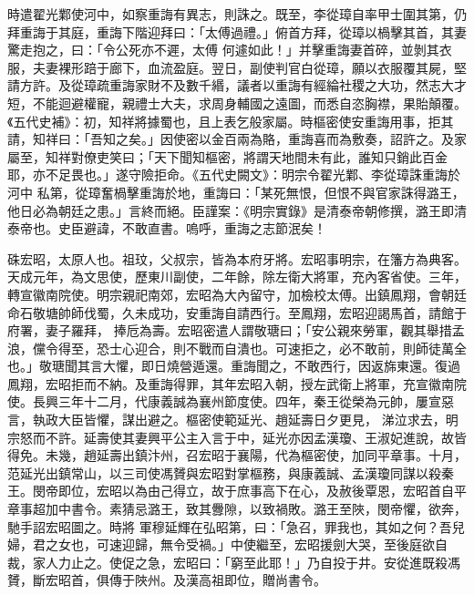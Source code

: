 \begin{pinyinscope}
 時遣翟光鄴使河中，如察重誨有異志，則誅之。既至，李從璋自率甲士圍其第，仍拜重誨于其庭，重誨下階迎拜曰：「太傅過禮。」俯首方拜，從璋以楇擊其首，其妻驚走抱之，曰：「令公死亦不遲，太傅
 何遽如此！」并擊重誨妻首碎，並剝其衣服，夫妻裸形踣于廊下，血流盈庭。翌日，副使判官白從璋，願以衣服覆其屍，堅請方許。及從璋疏重誨家財不及數千緡，議者以重誨有經綸社稷之大功，然志大才短，不能迴避權寵，親禮士大夫，求周身輔國之遠圖，而悉自恣胸襟，果貽顛覆。《五代史補》：初，知祥將據蜀也，且上表乞般家屬。時樞密使安重誨用事，拒其請，知祥曰：「吾知之矣。」因使密以金百兩為賂，重誨喜而為敷奏，詔許之。及家屬至，知祥對僚吏笑曰；「天下聞知樞密，將謂天地間未有此，誰知只銷此百金耶，亦不足畏也。」遂守險拒命。《五代史闕文》：明宗令翟光鄴、李從璋誅重誨於河中
 私第，從璋奮楇擊重誨於地，重誨曰：「某死無恨，但恨不與官家誅得潞王，他日必為朝廷之患。」言終而絕。臣謹案：《明宗實錄》是清泰帝朝修撰，潞王即清泰帝也。史臣避諱，不敢直書。嗚呼，重誨之志節泯矣！



 硃宏昭，太原人也。祖玟，父叔宗，皆為本府牙將。宏昭事明宗，在籓方為典客。天成元年，為文思使，歷東川副使，二年餘，除左衛大將軍，充內客省使。三年，轉宣徽南院使。明宗親祀南郊，宏昭為大內留守，加檢校太傅。出鎮鳳翔，會朝廷命石敬塘帥師伐蜀，久未成功，安重誨自請西行。至鳳翔，宏昭迎謁馬首，請館于府署，妻子羅拜，
 捧卮為壽。宏昭密遣人謂敬瑭曰；「安公親來勞軍，觀其舉措孟浪，儻令得至，恐士心迎合，則不戰而自潰也。可速拒之，必不敢前，則師徒萬全也。」敬瑭聞其言大懼，即日燒營遁還。重誨聞之，不敢西行，因返旆東還。復過鳳翔，宏昭拒而不納。及重誨得罪，其年宏昭入朝，授左武衛上將軍，充宣徽南院使。長興三年十二月，代康義誠為襄州節度使。四年，秦王從榮為元帥，屢宣惡言，執政大臣皆懼，謀出避之。樞密使範延光、趙延壽日夕更見，
 涕泣求去，明宗怒而不許。延壽使其妻興平公主入言于中，延光亦因孟漢瓊、王淑妃進說，故皆得免。未幾，趙延壽出鎮汴州，召宏昭于襄陽，代為樞密使，加同平章事。十月，范延光出鎮常山，以三司使馮贇與宏昭對掌樞務，與康義誠、孟漢瓊同謀以殺秦王。閔帝即位，宏昭以為由己得立，故于庶事高下在心，及赦後覃恩，宏昭首自平章事超加中書令。素猜忌潞王，致其釁隙，以致禍敗。潞王至陜，閔帝懼，欲奔，馳手詔宏昭圖之。時將
 軍穆延輝在弘昭第，曰：「急召，罪我也，其如之何？吾兒婦，君之女也，可速迎歸，無令受禍。」中使繼至，宏昭援劍大哭，至後庭欲自裁，家人力止之。使促之急，宏昭曰：「窮至此耶！」乃自投于井。安從進既殺馮贇，斷宏昭首，俱傳于陜州。及漢高祖即位，贈尚書令。




\end{pinyinscope}
